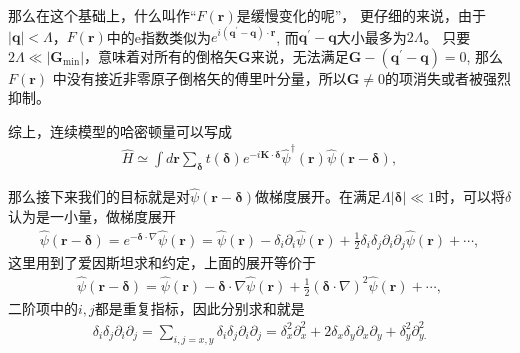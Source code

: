 \documentclass[10pt, oneside]{article}
\begin{document}
那么在这个基础上，什么叫作“\(F \left(\bm{r}\right)\)是缓慢变化的呢”， 更仔细的来说，由于 \(\left|\bm{q}\right|  < \Lambda\)，\(F \left(\bm{r}\right)\)中的e指数类似为\(e^{i \left(\bm{q}^{\prime} - \bm{q}\right) \cdot \bm{r}}\), 而\(\bm{q}^{\prime} - \bm{q}\)大小最多为\(2 \Lambda\)。 只要\(2 \Lambda \ll \left|\bm{G}_{\mathrm{min}}\right|\)，意味着对所有的倒格矢\(\bm{G}\)来说，无法满足\(\bm{G} - \left(\bm{q}^{\prime} - \bm{q}\right) = 0\), 那么\(F \left(\bm{r}\right)\) 中没有接近非零原子倒格矢的傅里叶分量，所以\(\bm{G} \neq 0\)的项消失或者被强烈抑制。

综上，连续模型的哈密顿量可以写成
\begin{align}
	\boxed{
		\hat{H} \simeq \int d \bm{r} \sum_{ \bm{\delta}}  t \left(\bm{\delta}\right) e^{- i \bm{K} \cdot \bm{\delta}} \hat{\psi}^{\dagger} \left(\bm{r}\right) \hat{\psi} \left(\bm{r} - \bm{\delta}\right),
	}
\end{align}

那么接下来我们的目标就是对\(\hat{\psi} \left(\bm{r} - \bm{\delta}\right)\)做梯度展开。在满足\(\Lambda \left|\bm{\delta}\right| \ll 1\)时，可以将\(\delta\)认为是一小量，做梯度展开
\begin{align}
	\hat{\psi} \left(\bm{r} - \bm{\delta}\right) = e^{- \bm{\delta} \cdot \nabla} \hat{\psi} \left(\bm{r}\right) =  \hat{\psi} \left(\bm{r}\right) - \delta_{i} \partial_{i} \hat{\psi} \left(\bm{r}\right) + \frac12 \delta_{i}  \delta_{j}  \partial_{i} \partial_{j} \hat{\psi} \left(\bm{r}\right) + \cdots,
\end{align}
这里用到了爱因斯坦求和约定，上面的展开等价于
\begin{align}
	\hat{\psi} \left(\bm{r} - \bm{\delta}\right) = \hat{\psi} \left(\bm{r}\right) - \bm{\delta} \cdot \nabla  \hat{\psi} \left(\bm{r}\right) + \frac12 \left(\bm{\delta} \cdot \nabla\right)^{2}  \hat{\psi} \left(\bm{r}\right) + \cdots,
\end{align}
二阶项中的\(i,j\)都是重复指标，因此分别求和就是
\begin{align}
	\delta_{i}  \delta_{j}  \partial_{i} \partial_{j} = \sum_{i,j = x,y} \delta_{i}  \delta_{j}  \partial_{i} \partial_{j}  = \delta^{2}_{x} \partial^{2}_{x} + 2 \delta_{x} \delta_{y} \partial_{x} \partial_{y} + \delta^{2}_{y} \partial^{2}_{y.}
\end{align}
\end{document}
